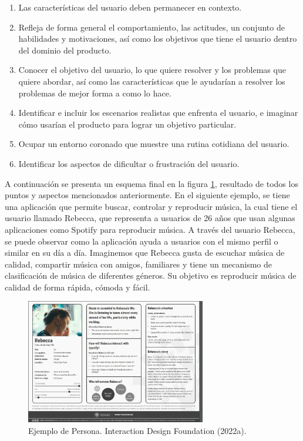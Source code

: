 \begin{enumerate}
  \item Las características del usuario deben permanecer en contexto.
  \item Refleja de forma general el comportamiento, las actitudes, un conjunto de habilidades y motivaciones, así como los objetivos que tiene el usuario dentro del dominio del producto.
  \item Conocer el objetivo del usuario, lo que quiere resolver y los problemas que quiere abordar, así como las características que le ayudarían a resolver los problemas de mejor forma a como lo hace.
  \item Identificar e incluir los escenarios realistas que enfrenta el usuario, e imaginar cómo usarían el producto para lograr un objetivo particular.
  \item Ocupar un entorno coronado que muestre una rutina cotidiana del usuario.
  \item Identificar los aspectos de dificultar o frustración del usuario.
\end{enumerate}

A continuación se presenta un esquema final en la figura \ref{fig:34}, resultado de todos los puntos y aspectos mencionados anteriormente. En el siguiente ejemplo, se tiene una aplicación que permite buscar, controlar y reproducir música, la cual tiene el usuario llamado Rebecca, que representa a usuarios de 26 años que usan algunas aplicaciones como Spotify para reproducir música. A través del usuario Rebecca, se puede observar como la aplicación ayuda a usuarios con el mismo perfil o similar en su día a día. Imaginemos que Rebecca gusta de escuchar música de calidad, compartir música con amigos, familiares y tiene un mecanismo de clasificación de música de diferentes géneros. Su objetivo es reproducir música de calidad de forma rápida, cómoda y fácil.

\begin{figure}
  \centering
  \includegraphics[width=0.70\textwidth]{Cap3/Figuras/EjemploPersona.jpg}
  \caption{Ejemplo de Persona. Interaction Design Foundation (2022a).}
  \label{fig:34}
\end{figure}

